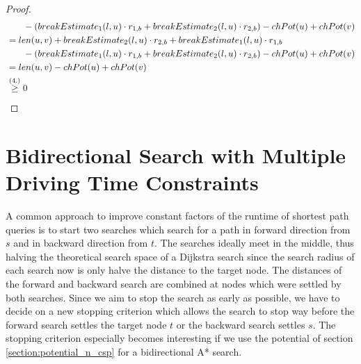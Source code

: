\begin{proof}
\begin{align}
\begin{split}
			& \phantom{{}=1} - (\breakEstimate_1(l,u) \cdot \restr_{1,b} + \breakEstimate_2(l,u) \cdot \restr_{2,b}) - \chpotential(u) + \chpotential(v)\\
			&= \len(u,v) + \breakEstimate_2(l,u) \cdot \restr_{2,b} + \breakEstimate_1(l,u) \cdot \restr_{1,b} \\
			& \phantom{{}=1} - (\breakEstimate_1(l,u) \cdot \restr_{1,b} + \breakEstimate_2(l,u) \cdot \restr_{2,b}) - \chpotential(u) + \chpotential(v)\\
			&= \len(u,v) - \chpotential(u) + \chpotential(v)\\
			&\stackrel{\text{(4.)}}{\ge} 0
		\end{split}
	\end{align}

\end{proof}




\section{Bidirectional Search with Multiple Driving Time Constraints}
A common approach to improve constant factors of the runtime of shortest path queries is to start two searches which search for a path in forward direction from $s$ and in backward direction from $t$. The searches ideally meet in the middle, thus halving the theoretical search space of a Dijkstra search since the search radius of each search now is only halve the distance to the target node. The distances of the forward and backward search are combined at nodes which were settled by both searches. Since we aim to stop the search as early as possible, we have to decide on a new stopping criterion which allows the search to stop way before the forward search settles the target node $t$ or the backward search settles $s$. The stopping criterion especially becomes interesting if we use the potential of section \ref{section:potential_n_csp} for a bidirectional A* search.

